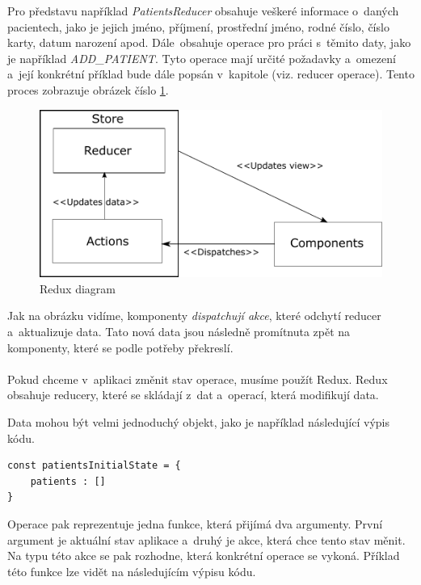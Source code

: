 Pro představu například \textit{PatientsReducer} obsahuje veškeré informace o~daných pacientech, jako je jejich jméno, příjmení, prostřední jméno, rodné číslo, číslo karty, datum narození apod. Dále~obsahuje operace pro práci s~těmito daty, jako je například \textit{ADD\_PATIENT}. Tyto operace mají určité požadavky a~omezení a~její konkrétní příklad bude dále popsán v~kapitole (viz. reducer operace).
Tento proces zobrazuje obrázek číslo \ref{fig:Redux}.

\begin{figure}[H]
	\centering
	\includegraphics[width=15cm]{../Redux.pdf}
	\caption{Redux diagram}	
	\label{fig:Redux}
\end{figure}

Jak na obrázku vidíme, komponenty \textit{dispatchují akce}, které odchytí reducer a~aktualizuje data. Tato nová data jsou následně promítnuta zpět na komponenty, které se podle potřeby překreslí. \\

 \\
Pokud chceme v~aplikaci změnit stav operace, musíme použít Redux. Redux obsahuje reducery, které se skládají z~dat a~operací, která modifikují data.

Data mohou být velmi jednoduchý objekt, jako je například následující výpis kódu. \\

\begin{lstlisting}[numbers=none, caption={Ukázka inicializačních dat v~reduceru pacienta.}]
const patientsInitialState = {
	patients : []
}
\end{lstlisting}

Operace pak reprezentuje jedna funkce, která přijímá dva argumenty. První argument je aktuální stav aplikace a~druhý je akce, která chce tento stav měnit.
Na typu této akce se pak rozhodne, která konkrétní operace se vykoná. Příklad této funkce lze vidět na následujícím výpisu kódu. \\

